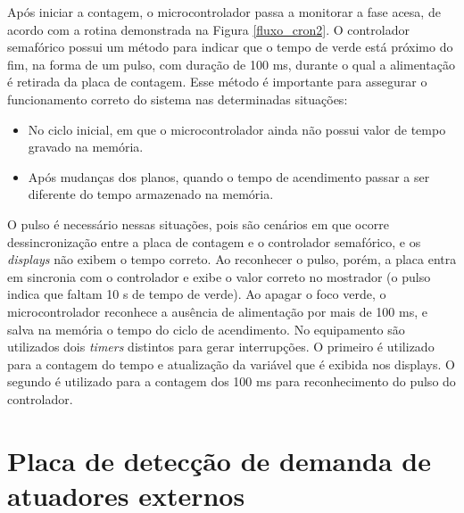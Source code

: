 Após iniciar a contagem, o microcontrolador passa a monitorar a fase acesa, de acordo com a rotina demonstrada na Figura \ref{fluxo_cron2}. O controlador semafórico possui um método para indicar que o tempo de verde está próximo do fim, na forma de um pulso, com duração de 100 ms, durante o qual a alimentação é retirada da placa de contagem. Esse método é importante para assegurar o funcionamento correto do sistema nas determinadas situações:

\begin{itemize}
\item No ciclo inicial, em que o microcontrolador ainda não possui valor de tempo gravado na memória.
\item Após mudanças dos planos, quando o tempo de acendimento passar a ser diferente do tempo armazenado na memória.
\end{itemize}

O pulso é necessário nessas situações, pois são cenários em que ocorre dessincronização entre a placa de contagem e o controlador semafórico, e os \textit{displays} não exibem o tempo correto. Ao reconhecer o pulso, porém, a placa entra em sincronia com o controlador e exibe o valor correto no mostrador (o pulso indica que faltam 10 s de tempo de verde). Ao apagar o foco verde, o microcontrolador reconhece a ausência de alimentação por mais de 100 ms, e salva na memória o tempo do ciclo de acendimento.
No equipamento são utilizados dois \textit{timers} distintos para gerar interrupções. O primeiro é utilizado para a contagem do tempo e atualização da variável que é exibida nos displays. O segundo é utilizado para a contagem dos 100 ms para reconhecimento do pulso do controlador.

\section{Placa de detecção de demanda de atuadores externos}

